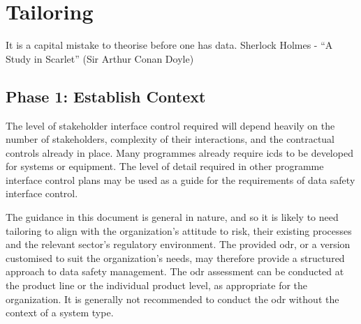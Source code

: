 %
%
\chapter{Tailoring}\label{bkm:tailoring}

\dsiwgSectionQuote
  {It is a capital mistake to theorise before one has data.}
  {Sherlock Holmes - ``A Study in Scarlet'' (Sir Arthur Conan Doyle)}


\section{Phase 1: Establish Context}
The level of
\gls{stakeholder}
interface control required will depend heavily on the number of \glspl{stakeholder}, complexity of their interactions, and the contractual controls already in place. Many programmes already require \glspl{icd} to be developed for systems or equipment. The level of detail required in other programme interface control plans may be used as a guide for the requirements of data safety interface control. 

The guidance in this document is general in nature, and so it is likely to need \gls{tailoring} to align with the organization's attitude to risk, their existing processes and the relevant sector's regulatory environment. The provided \gls{odr}, or a version customised to suit the organization's needs, may therefore provide a structured approach to \cbstart data safety management\cbend.
The \gls{odr} assessment can be conducted at the product line or the individual product level, as appropriate for the organization. It is generally not recommended to conduct the \gls{odr} without the context of a system type.

